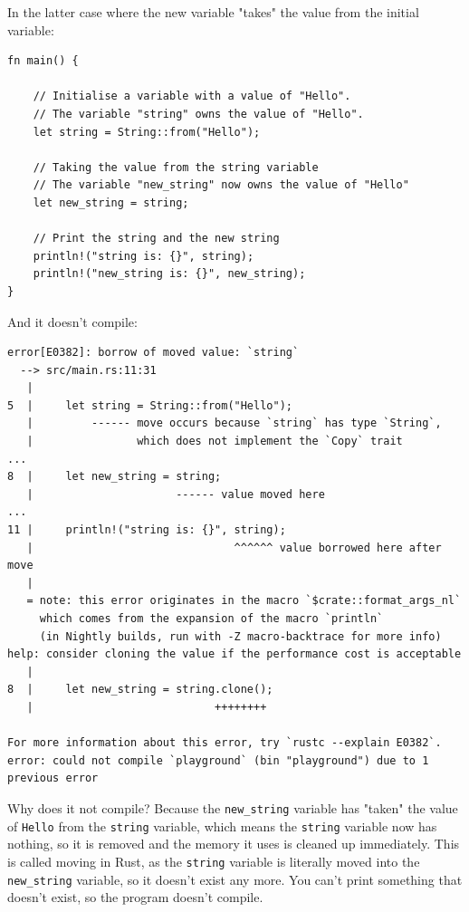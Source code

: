 \documentclass[11pt]{article}
\begin{document}
 \newpage

In the latter case where the new variable
"takes" the value from the initial variable:
\begin{verbatim}
fn main() {

    // Initialise a variable with a value of "Hello".
    // The variable "string" owns the value of "Hello".
    let string = String::from("Hello");

    // Taking the value from the string variable
    // The variable "new_string" now owns the value of "Hello"
    let new_string = string;

    // Print the string and the new string
    println!("string is: {}", string);
    println!("new_string is: {}", new_string);
}
\end{verbatim}

 \newpage

And it doesn't compile:
\begin{verbatim}
error[E0382]: borrow of moved value: `string`
  --> src/main.rs:11:31
   |
5  |     let string = String::from("Hello");
   |         ------ move occurs because `string` has type `String`,
   |                which does not implement the `Copy` trait
...
8  |     let new_string = string;
   |                      ------ value moved here
...
11 |     println!("string is: {}", string);
   |                               ^^^^^^ value borrowed here after move
   |
   = note: this error originates in the macro `$crate::format_args_nl`
     which comes from the expansion of the macro `println`
     (in Nightly builds, run with -Z macro-backtrace for more info)
help: consider cloning the value if the performance cost is acceptable
   |
8  |     let new_string = string.clone();
   |                            ++++++++

For more information about this error, try `rustc --explain E0382`.
error: could not compile `playground` (bin "playground") due to 1 previous error
\end{verbatim}

Why does it not compile? Because the \texttt{new\_string} variable
has "taken" the value of \texttt{Hello} from the \texttt{string} variable,
which means the \texttt{string} variable now has nothing,
so it is removed and the memory it uses is cleaned up immediately.
This is called moving in Rust, as the \texttt{string} variable is
literally moved into the \texttt{new\_string} variable,
so it doesn't exist any more. You can't print
something that doesn't exist, so the program doesn't compile.
\end{document}
